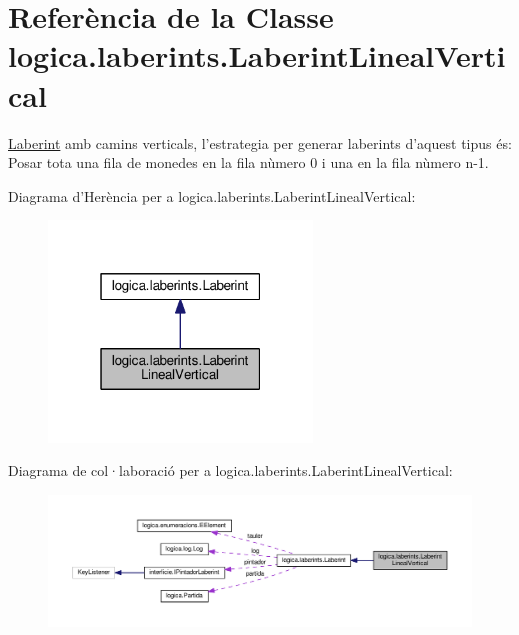 \hypertarget{classlogica_1_1laberints_1_1_laberint_lineal_vertical}{\section{Referència de la Classe logica.\+laberints.\+Laberint\+Lineal\+Vertical}
\label{classlogica_1_1laberints_1_1_laberint_lineal_vertical}
}


\hyperlink{classlogica_1_1laberints_1_1_laberint}{Laberint} amb camins verticals, l'estrategia per generar laberints d'aquest tipus és\+: Posar tota una fila de monedes en la fila nùmero 0 i una en la fila nùmero n-\/1.  




Diagrama d'Herència per a logica.\+laberints.\+Laberint\+Lineal\+Vertical\+:\nopagebreak
\begin{figure}[H]
\begin{center}
\leavevmode
\includegraphics[width=199pt]{classlogica_1_1laberints_1_1_laberint_lineal_vertical__inherit__graph}
\end{center}
\end{figure}


Diagrama de col·laboració per a logica.\+laberints.\+Laberint\+Lineal\+Vertical\+:\nopagebreak
\begin{figure}[H]
\begin{center}
\leavevmode
\includegraphics[width=350pt]{classlogica_1_1laberints_1_1_laberint_lineal_vertical__coll__graph}
\end{center}
\end{figure}
